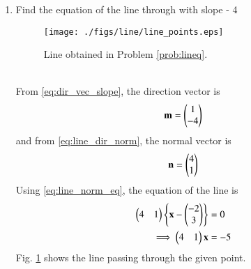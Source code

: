 \begin{enumerate}[label=\thesubsection.\arabic*.,ref=\thesubsection.\theenumi]
\item  Find the equation of the line through  with slope - 4 
\label{prob:lineq}
%
\begin{figure}
\centering
\texttt{[image: ./figs/line/line\_points.eps]}
\caption{ Line obtained in Problem \ref{prob:lineq}.}%
\label{fig:line_equation}
\end{figure}
\\
\solution From \eqref{eq:dir_vec_slope}, the direction vector is
\begin{align}
\label{eq:lineq_dir}
\mathbf{m} = \begin{pmatrix}1\\-4\end{pmatrix}
\end{align}
and from \eqref{eq:line_dir_norm}, the normal vector is
\begin{align}
\label{eq:lineq_norm}
\mathbf{n} = \begin{pmatrix}4\\1\end{pmatrix}
\end{align}
Using \eqref{eq:line_norm_eq}, the equation of the line is 
\begin{align}
\label{eq:lineq_norm_arith}
\begin{pmatrix}4 &1\end{pmatrix}\left\{\mathbf{x}-\begin{pmatrix}- 2\\ 3\end{pmatrix}\right\} &= 0
\\
\implies \begin{pmatrix}4 &1\end{pmatrix}\mathbf{x} &= -5
\label{eq:lineq_norm_final}
\end{align}
Fig. \ref{fig:line_equation} shows the line passing through the given point.


\end{enumerate}
